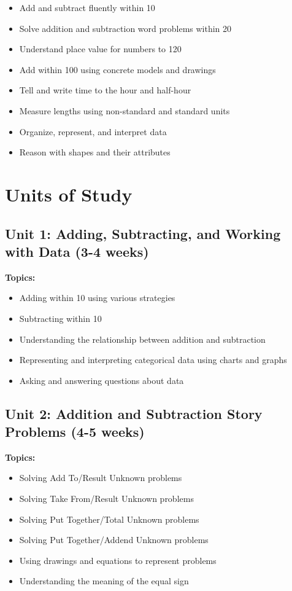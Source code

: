 \documentclass[11pt,letterpaper]{report}
\begin{document}
\begin{itemize}
    \item Add and subtract fluently within 10
    \item Solve addition and subtraction word problems within 20
    \item Understand place value for numbers to 120
    \item Add within 100 using concrete models and drawings
    \item Tell and write time to the hour and half-hour
    \item Measure lengths using non-standard and standard units
    \item Organize, represent, and interpret data
    \item Reason with shapes and their attributes
\end{itemize}

\section{Units of Study}

\subsection{Unit 1: Adding, Subtracting, and Working with Data (3-4 weeks)}

\textbf{Topics:}
\begin{itemize}
    \item Adding within 10 using various strategies
    \item Subtracting within 10
    \item Understanding the relationship between addition and subtraction
    \item Representing and interpreting categorical data using charts and graphs
    \item Asking and answering questions about data
\end{itemize}

\subsection{Unit 2: Addition and Subtraction Story Problems (4-5 weeks)}

\textbf{Topics:}
\begin{itemize}
    \item Solving Add To/Result Unknown problems
    \item Solving Take From/Result Unknown problems
    \item Solving Put Together/Total Unknown problems
    \item Solving Put Together/Addend Unknown problems
    \item Using drawings and equations to represent problems
    \item Understanding the meaning of the equal sign
\end{itemize}
\end{document}

